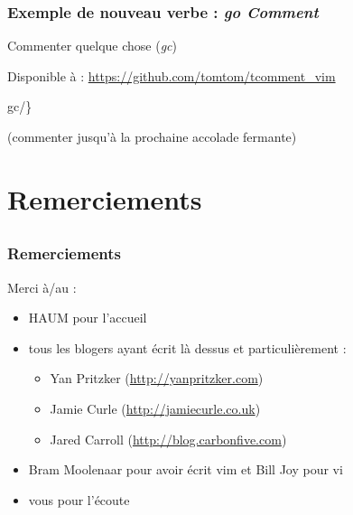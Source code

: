 \documentclass{beamer}
\begin{document}
\begin{frame}
\frametitle{Exemple de nouveau verbe : {\it go Comment}}

Commenter quelque chose ({\it gc})

Disponible à : \url{https://github.com/tomtom/tcomment_vim}
\pause{}

\begin{center}
    gc/\}
    \pause{}

    (commenter jusqu'à la prochaine accolade fermante)
\end{center}
    
\end{frame}

\section{Remerciements}
\subsection{}
\frame{\tableofcontents[currentsection]}

\begin{frame}
\frametitle{Remerciements}

Merci à/au :

\begin{itemize}
    \item HAUM pour l'accueil
    \item tous les blogers ayant écrit là dessus et particulièrement :
    \begin{itemize}
        \item Yan Pritzker (\url{http://yanpritzker.com})
        \item Jamie Curle (\url{http://jamiecurle.co.uk})
        \item Jared Carroll (\url{http://blog.carbonfive.com})
    \end{itemize}
    \item Bram Moolenaar pour avoir écrit vim et Bill Joy pour vi
    \item vous pour l'écoute
\end{itemize}
\end{frame}
\end{document}
